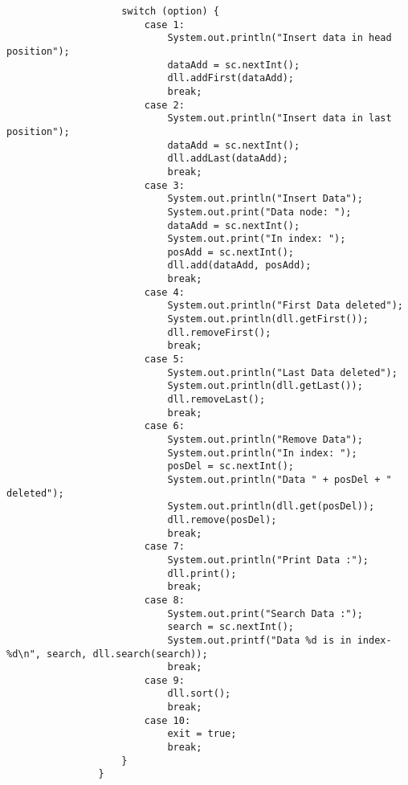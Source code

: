 \documentclass[12pt,titlepage]{article}
\begin{document}
\begin{enumerate}
\begin{verbatim}
                    switch (option) {
                        case 1:
                            System.out.println("Insert data in head position");
                            dataAdd = sc.nextInt();
                            dll.addFirst(dataAdd);
                            break;
                        case 2:
                            System.out.println("Insert data in last position");
                            dataAdd = sc.nextInt();
                            dll.addLast(dataAdd);
                            break;
                        case 3:
                            System.out.println("Insert Data");
                            System.out.print("Data node: ");
                            dataAdd = sc.nextInt();
                            System.out.print("In index: ");
                            posAdd = sc.nextInt();
                            dll.add(dataAdd, posAdd);
                            break;
                        case 4:
                            System.out.println("First Data deleted");
                            System.out.println(dll.getFirst());
                            dll.removeFirst();
                            break;
                        case 5:
                            System.out.println("Last Data deleted");
                            System.out.println(dll.getLast());
                            dll.removeLast();
                            break;
                        case 6:
                            System.out.println("Remove Data");
                            System.out.println("In index: ");
                            posDel = sc.nextInt();
                            System.out.println("Data " + posDel + " deleted");
                            System.out.println(dll.get(posDel));
                            dll.remove(posDel);
                            break;
                        case 7:
                            System.out.println("Print Data :");
                            dll.print();
                            break;
                        case 8:
                            System.out.print("Search Data :");
                            search = sc.nextInt();
                            System.out.printf("Data %d is in index-%d\n", search, dll.search(search));
                            break;
                        case 9:
                            dll.sort();
                            break;
                        case 10:
                            exit = true;
                            break;
                    }
                }
                

\end{verbatim}
\end{enumerate}
\end{document}
